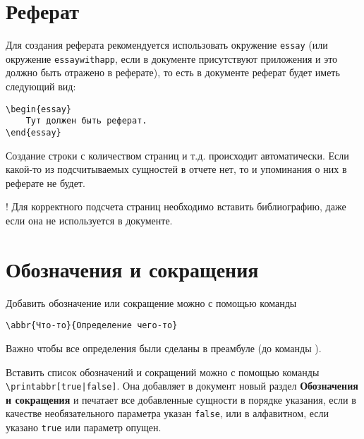 \section{Реферат}

Для создания реферата рекомендуется использовать окружение \lstinline:essay:
(или окружение \lstinline:essaywithapp:, если в документе присутствуют
приложения и это должно быть отражено в реферате), то есть в документе реферат
будет иметь следующий вид: 

\newpage
{\noindent
\lstinline$\begin{essay}$\\
\lstinline$    Тут должен быть реферат.$\\
\lstinline$\end{essay}$
}

Создание строки с количеством страниц и т.д. происходит автоматически. Если
какой-то из подсчитываемых сущностей в отчете нет, то и упоминания о них в
реферате не будет.

! Для корректного подсчета страниц необходимо вставить библиографию, даже если
она не используется в документе.

\section{Обозначения и сокращения}

Добавить обозначение или сокращение можно с помощью команды

\lstinline:\abbr{Что-то}{Определение чего-то}: 

Важно чтобы все определения были сделаны в преамбуле (до команды
\lstinline::). 

Вставить список обозначений и сокращений можно с помощью
команды \lstinline:\printabbr[true|false]:. Она добавляет в документ новый раздел
\textbf{Обозначения и сокращения} и печатает все добавленные сущности в
порядке указания, если в качестве необязательного параметра указан
\lstinline:false:, или в алфавитном, если указано \lstinline:true: или параметр
опущен. 